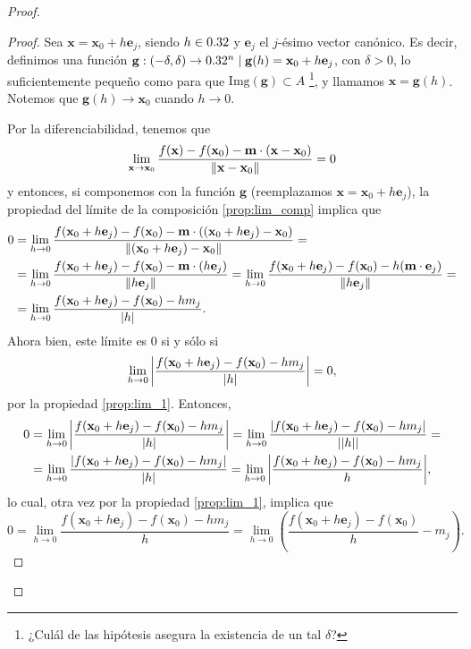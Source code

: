 \begin{theorem}
\begin{proof}
 \begin{proof}
 \mbox{}
 
Sea $\mathbf{x} = \mathbf{x}_0 + h \mathbf{e}_j$, siendo $h \in 0.32$ y $\mathbf{e}_j$ el $j$-\'esimo vector can\'onico. Es decir, definimos una funci\'on $\mathbf{g}:(-\delta,\delta) \to 0.32^n\;|\; \mathbf{g}(h) = \mathbf{x}_0 + h \mathbf{e}_j$, con $\delta > 0$, lo suficientemente peque\~{n}o como para que $\text{Img}(\mathbf{g}) \subset A$ \footnote{¿Cul\'al de las hip\'otesis asegura la existencia de un tal $\delta$?}, y llamamos $\mathbf{x} = \mathbf{g}(h)$. Notemos que $\mathbf{g}(h) \to \mathbf{x}_0$ cuando $h \to 0$. 

Por la diferenciabilidad, tenemos que 
\[
 \lim_{\mathbf{x} \to \mathbf{x}_0} \frac{f(\mathbf{x}) - f(\mathbf{x}_0) - \mathbf{m} \cdot (\mathbf{x} - \mathbf{x}_0)}
                                 {\norm{\mathbf{x} - \mathbf{x}_0}} = 0
\]
y entonces, si componemos con la funci\'on $\mathbf{g}$ (reemplazamos $\mathbf{x} = \mathbf{x}_0 + h \mathbf{e}_j$), la propiedad del l\'imite de la composici\'on \eqref{prop:lim_comp} implica que
\begin{align*}
  0 & = \lim_{h \to 0} \frac{f(\mathbf{x}_0 + h \mathbf{e}_j) - f(\mathbf{x}_0) - \mathbf{m} \cdot ((\mathbf{x}_0 + h\mathbf{e}_j) - \mathbf{x}_0)}
                                 {\norm{(\mathbf{x}_0 + h\mathbf{e}_j) - \mathbf{x}_0}} = \\
    & = \lim_{h \to 0} \frac{f(\mathbf{x}_0 + h \mathbf{e}_j) - f(\mathbf{x}_0) - \mathbf{m} \cdot (h\mathbf{e}_j)}{\norm{h \mathbf{e}_j}} = \lim_{h \to 0} \frac{f(\mathbf{x}_0 + h \mathbf{e}_j) - f(\mathbf{x}_0) - h(\mathbf{m} \cdot \mathbf{e}_j)}{\norm{h \mathbf{e}_j}} =\\
    & = \lim_{h \to 0} \frac{f(\mathbf{x}_0 + h \mathbf{e}_j) - f(\mathbf{x}_0) - h m_j}{\abs{h}} .
\end{align*}                                
Ahora bien, este l\'imite es $0$ si y s\'olo si
\[
 \lim_{h \to 0} \abs{ \frac{f(\mathbf{x}_0 + h \mathbf{e}_j) - f(\mathbf{x}_0) - h m_j}{\abs{h}} } = 0,
\]
por la propiedad \eqref{prop:lim_1}. Entonces,
\begin{align*}
  0 & = \lim_{h \to 0} \abs{ \frac{f(\mathbf{x}_0 + h \mathbf{e}_j) - f(\mathbf{x}_0) - h m_j}{\abs{h}} }
      = \lim_{h \to 0} \frac{\abs{f(\mathbf{x}_0 + h \mathbf{e}_j) - f(\mathbf{x}_0) - h m_j}}{\abs{\abs{h}}} = \\
    & = \lim_{h \to 0} \frac{\abs{f(\mathbf{x}_0 + h \mathbf{e}_j) - f(\mathbf{x}_0) - h m_j}}{\abs{h}}
      = \lim_{h \to 0} \abs{ \frac{f(\mathbf{x}_0 + h \mathbf{e}_j) - f(\mathbf{x}_0) - h m_j}{h} },
\end{align*} 
lo cual, otra vez por la propiedad \eqref{prop:lim_1}, implica que 
\[
 0 = \lim_{h \to 0} \frac{f(\mathbf{x}_0 + h \mathbf{e}_j) - f(\mathbf{x}_0) - h m_j}{h} =
     \lim_{h \to 0} \left( \frac{f(\mathbf{x}_0 + h \mathbf{e}_j) - f(\mathbf{x}_0)}{h} - m_j \right) .
\]


\end{proof}
\end{proof}
\end{theorem}
